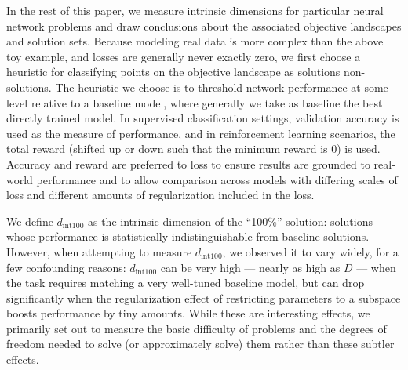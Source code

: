 \documentclass{article} %
\newcommand{\dinto}{d_{\mathrm{int100}}}
\begin{document}
In the rest of this paper, we measure intrinsic dimensions for particular neural network problems and draw conclusions about the associated objective landscapes and solution sets. Because modeling real data is more complex than the above toy example, and losses are generally never exactly zero, we first choose a heuristic for classifying points on the objective landscape as solutions \vs non-solutions.
The heuristic we choose is to threshold network performance at some level relative to a baseline model, where generally we take as baseline the best directly trained model.
In supervised classification settings, validation accuracy is used as the measure of performance, and in reinforcement learning scenarios, the total reward (shifted up or down such that the minimum reward is 0) is used.
Accuracy and reward are preferred to loss to ensure results are grounded to real-world performance and to allow comparison across models with differing scales of loss and different amounts of regularization included in the loss.


We define $\dinto$ as the intrinsic dimension of the ``100\%'' solution: solutions whose performance is statistically indistinguishable from baseline solutions. However, when attempting to measure $\dinto$, we observed it to vary widely, for a few confounding reasons: $\dinto$ can be very high --- nearly as high as $D$ --- when the task requires matching a very well-tuned baseline model, but can drop significantly when the regularization effect of restricting parameters to a subspace boosts performance by tiny amounts.
%
While these are interesting effects, we primarily set out to measure the basic difficulty of problems and the degrees of freedom needed to solve (or approximately solve) them rather than these subtler effects.



\end{document}
